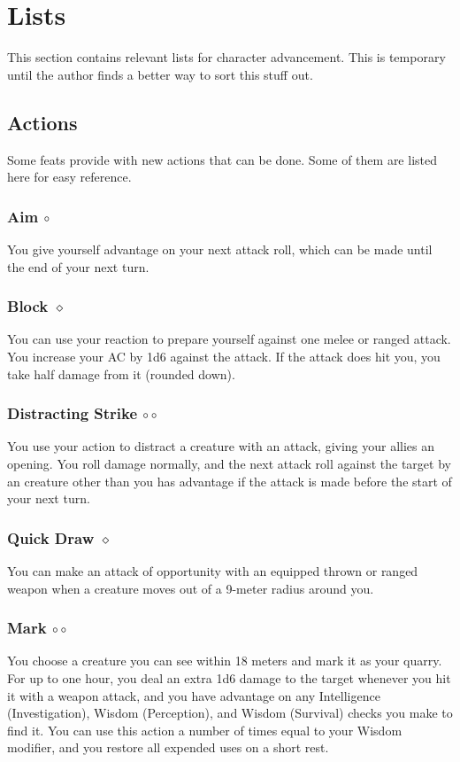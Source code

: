 \section{Lists} %
This section contains relevant lists for character advancement.
This is temporary until the author finds a better way to sort this stuff out.

\subsection*{Actions} \label{ssec::actions}
    Some feats provide with new actions that can be done.
    Some of them are listed here for easy reference.

    \subsubsection{Aim $\circ$} \label{act::aim}
        You give yourself advantage on your next attack roll, which can be made until the end of your next turn.
    \subsubsection{Block $\diamond$} \label{act::block}
        You can use your reaction to prepare yourself against one melee or ranged attack.
        You increase your AC by 1d6 against the attack.
        If the attack does hit you, you take half damage from it (rounded down).
    \subsubsection{Distracting Strike $\circ\circ$} \label{act::distractingstrike}
        You use your action to distract a creature with an attack, giving your allies an opening.
        You roll damage normally, and the next attack roll against the target by an creature other than you has advantage if the attack is made before the start of your next turn.
    \subsubsection{Quick Draw $\diamond$} \label{act::quickdraw}
        You can make an attack of opportunity with an equipped thrown or ranged weapon when a creature moves out of a 9-meter radius around you.
    \subsubsection{Mark $\circ\circ$} \label{act::mark}
        You choose a creature you can see within 18 meters and mark it as your quarry.
        For up to one hour, you deal an extra 1d6 damage to the target whenever you hit it with a weapon attack, and you have advantage on any Intelligence (Investigation), Wisdom (Perception), and Wisdom (Survival) checks you make to find it.
        You can use this action a number of times equal to your Wisdom modifier, and you restore all expended uses on a short rest.
